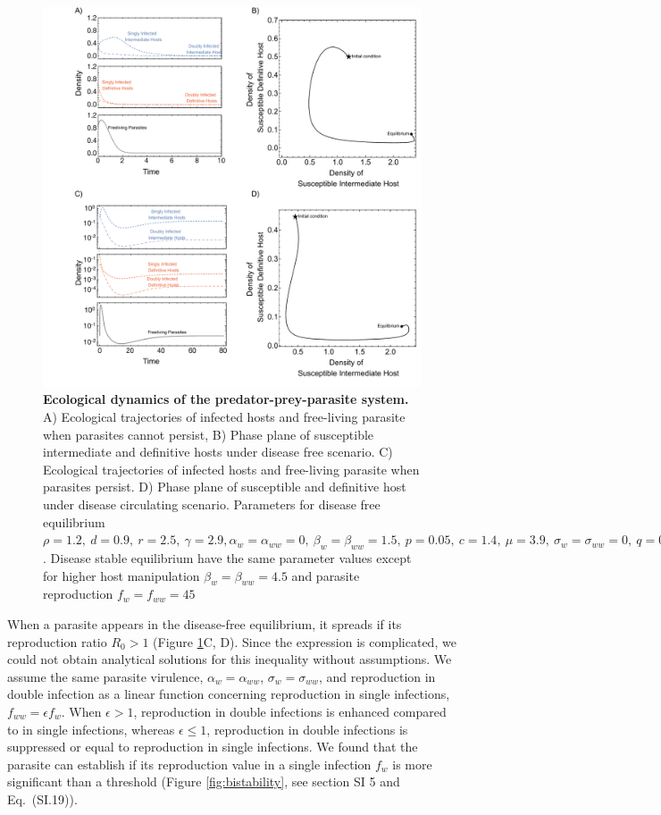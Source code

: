 \documentclass[a4paper]{scrartcl}
\begin{document}
\begin{figure}[!ht]
\captionsetup{format=plain}
\includegraphics[width=\textwidth]{Figures/ecotraject_nonlinear.pdf}
\caption{\textbf{Ecological dynamics of the predator-prey-parasite system.} A) Ecological trajectories of infected hosts and free-living parasite when parasites cannot persist, B) Phase plane of susceptible intermediate and definitive hosts under disease free scenario. C) Ecological trajectories of infected hosts and free-living parasite when parasites persist. D) Phase plane of susceptible and definitive host under disease circulating scenario. Parameters for disease free equilibrium $\rho =  1.2, \ d = 0.9, \  r = 2.5, \ \gamma =  2.9, \alpha_w = \alpha_{ww} =  0, \ \beta_w = \beta_{ww} = 1.5, \ p = 0.05, \  c = 1.4, \ \mu = 3.9, \ \sigma_w = \sigma_{ww} = 0, \ q = 0.05, \ f_w = f_{ww} = 7.5, \ \delta = 0.9, \ k = 0.26, \ h = 0.6$. Disease stable equilibrium have the same parameter values except for higher host manipulation $ \beta_w =  \beta_{ww} = 4.5$ and parasite reproduction $ f_w  = f_{ww} = 45$}
\label{fig:ecotraject:nonlinear}
\end{figure}

When a parasite appears in the disease-free equilibrium, it spreads if its reproduction ratio $R_0 > 1$ (Figure \ref{fig:ecotraject:nonlinear}C, D). 
Since the expression is complicated, we could not obtain analytical solutions for this inequality without assumptions. 
We assume the same parasite virulence, $\alpha_w = \alpha_{ww}$, $\sigma_w = \sigma_{ww}$, and reproduction in double infection as a linear function concerning reproduction in single infections, $f_{ww} = \epsilon f_w$. 
When $\epsilon > 1$, reproduction in double infections is enhanced compared to in single infections, whereas $\epsilon \leq 1$, reproduction in double infections is suppressed or equal to reproduction in single infections.
We found that the parasite can establish if its reproduction value in a single infection $f_w$ is more significant than a threshold (Figure \ref{fig:bistability}, see section SI 5 and Eq.~(SI.19)). 
\end{document}
